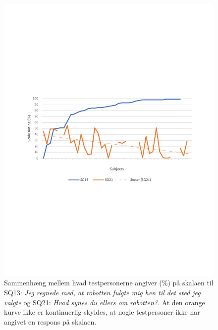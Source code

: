 \begin{figure}[H]
	\centering
	\includegraphics[width=\textwidth]{Figure/Korrelationsgrafer/SQ13+SQ21}
	\caption{Sammenhæng mellem hvad testpersonerne angiver (\%) på skalaen til SQ13: \textit{Jeg regnede med, at robotten fulgte mig hen til det sted jeg valgte} og SQ21: \textit{Hvad synes du ellers om robotten?}. At den orange kurve ikke er kontinuerlig skyldes, at nogle testpersoner ikke har angivet en respons på skalaen.}
	\label{fig:SammenligningSQ13SQ21}
\end{figure}
\noindent
%